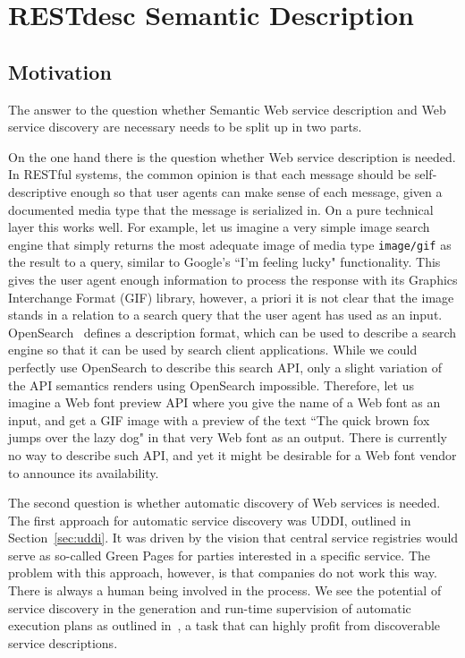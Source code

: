 \documentclass[runningheads,a4paper, twocolumn]{llncs}
\begin{document}
\section{RESTdesc Semantic Description} \label{sec:restdesc-semantic-description}
\label{RESTdesc}
\subsection{Motivation}
The answer to the question whether Semantic Web service description and Web service discovery are necessary needs to be split up in two parts.

On the one hand there is the question whether Web service description is needed. In RESTful systems, the common opinion is that each message should be self-descriptive enough so that user agents can make sense of each message, given a documented media type that the message is serialized in. On a pure technical layer this works well. For example, let us imagine a very simple image search engine that simply returns the most adequate image of media type \texttt{image/gif} as the result to a query, similar to Google's ``I'm feeling lucky" functionality. This gives the user agent enough information to process the response with its Graphics Interchange Format (GIF) library, however, a priori it is not clear that the image stands in a relation to a search query that the user agent has used as an input. OpenSearch~\cite{OpenSearch} defines a description format, which can be used to describe a search engine so that it can be used by search client applications. While we could perfectly use OpenSearch to describe this search API, only a slight variation of the API semantics renders using OpenSearch impossible. Therefore, let us imagine a Web font preview API where you give the name of a Web font as an input, and get a GIF image with a preview of the text ``The quick brown fox jumps over the lazy dog" in that very Web font as an output. There is currently no way to describe such API, and yet it might be desirable for a Web font vendor to announce its availability. 

The second question is whether automatic discovery of Web services is needed. The first approach for automatic service discovery was UDDI, outlined in Section~\ref{sec:uddi}. It was driven by the vision that central service registries would serve as so-called Green Pages for parties interested in a specific service. The problem with this approach, however, is that companies do not work this way. There is always a human being involved in the process\cite{UDDIDiscontinue}. We see the potential of service discovery in the generation and run-time supervision of automatic execution plans as outlined in~\cite{Verborgh:2011p4792}, a task that can highly profit from discoverable service descriptions.
\end{document}
